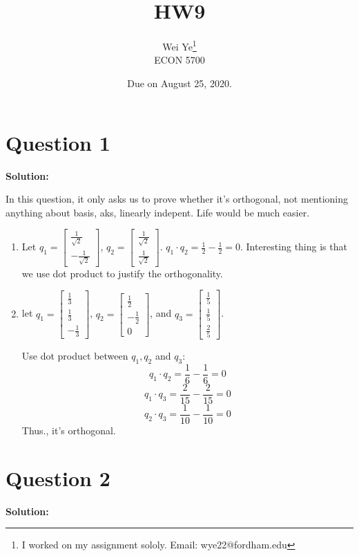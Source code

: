 \documentclass[11pt]{article} %
\title{HW9}
\author{Wei Ye\footnote{I worked on my assignment sololy. Email: wye22@fordham.edu}  	\\
	ECON 5700}
\date{Due on August 25, 2020.}
\begin{document}
	\maketitle
	\section{Question 1}
	\textbf{Solution:}
	
	In this question, it only asks us to prove whether it's orthogonal, not mentioning anything about basis, aks, linearly indepent. Life would be much easier.
	
	\begin{enumerate}
		\item Let $q_1=\begin{bmatrix}
			\frac{1}{\sqrt{2}}\\
			-\frac{1}{\sqrt{2}}
		\end{bmatrix}$, $q_2=\begin{bmatrix}
		\frac{1}{\sqrt{2}}\\
		\frac{1}{\sqrt{2}}
	\end{bmatrix}$. 
$q_1 \cdot q_2=\frac{1}{2}-\frac{1}{2}=0$. Interesting thing is that we use dot product to justify the orthogonality.

\item let $q_1=\begin{bmatrix}
	\frac{1}{3}\\
	\frac{1}{3}\\
	-\frac{1}{3}
\end{bmatrix}$, $q_2=\begin{bmatrix}
\frac{1}{2}\\-\frac{1}{2}\\0
\end{bmatrix}$, and $q_3=\begin{bmatrix}
\frac{1}{5}\\\frac{1}{5}\\\frac{2}{5}
\end{bmatrix}$.

Use dot product between $q_1, q_2$ and $q_3$: 
$$q_1\cdot q_2=\frac{1}{6}-\frac{1}{6}=0$$
$$q_1\cdot q_3=\frac{2}{15}-\frac{2}{15}=0$$
$$q_2\cdot q_3=\frac{1}{10}-\frac{1}{10}=0$$
Thus., it's orthogonal.
	\end{enumerate}
	
\section{Question 2}
\textbf{Solution:}
\end{document}
